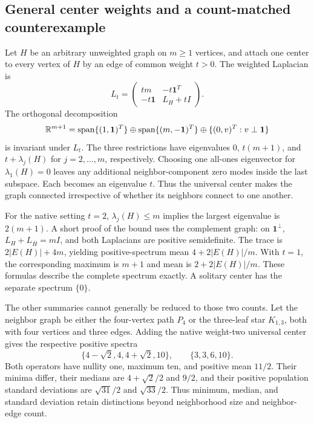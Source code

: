 \subsection{General center weights and a count-matched counterexample}
\label{sec:native_details}
Let $H$ be an arbitrary unweighted graph on $m\geq1$ vertices, and attach one center to every vertex of $H$ by an edge of common weight $t>0$. The weighted Laplacian is
\begin{equation}
L_t=\begin{pmatrix}tm&-t\mathbf1^T\\-t\mathbf1&L_H+tI\end{pmatrix}.
\end{equation}
The orthogonal decomposition
\begin{equation}
\mathbb{R}^{m+1}=\operatorname{span}\{(1,\mathbf1)^T\}
\oplus\operatorname{span}\{(m,-\mathbf1)^T\}
\oplus\{(0,v)^T:v\perp\mathbf1\}
\end{equation}
is invariant under $L_t$. The three restrictions have eigenvalues $0$, $t(m+1)$, and $t+\lambda_j(H)$ for $j=2,\ldots,m$, respectively. Choosing one all-ones eigenvector for $\lambda_1(H)=0$ leaves any additional neighbor-component zero modes inside the last subspace. Each becomes an eigenvalue $t$. Thus the universal center makes the graph connected irrespective of whether its neighbors connect to one another.

For the native setting $t=2$, $\lambda_j(H)\leq m$ implies the largest eigenvalue is $2(m+1)$. A short proof of the bound uses the complement graph: on $\mathbf1^\perp$, $L_H+L_{\overline H}=mI$, and both Laplacians are positive semidefinite. The trace is $2|E(H)|+4m$, yielding positive-spectrum mean $4+2|E(H)|/m$. With $t=1$, the corresponding maximum is $m+1$ and mean is $2+2|E(H)|/m$. These formulas describe the complete spectrum exactly. A solitary center has the separate spectrum $\{0\}$.

The other summaries cannot generally be reduced to those two counts. Let the neighbor graph be either the four-vertex path $P_4$ or the three-leaf star $K_{1,3}$, both with four vertices and three edges. Adding the native weight-two universal center gives the respective positive spectra
\begin{equation}
\{4-\sqrt2,4,4+\sqrt2,10\},\qquad \{3,3,6,10\}.
\end{equation}
Both operators have nullity one, maximum ten, and positive mean $11/2$. Their minima differ, their medians are $4+\sqrt2/2$ and $9/2$, and their positive population standard deviations are $\sqrt{31}/2$ and $\sqrt{33}/2$. Thus minimum, median, and standard deviation retain distinctions beyond neighborhood size and neighbor-edge count.


